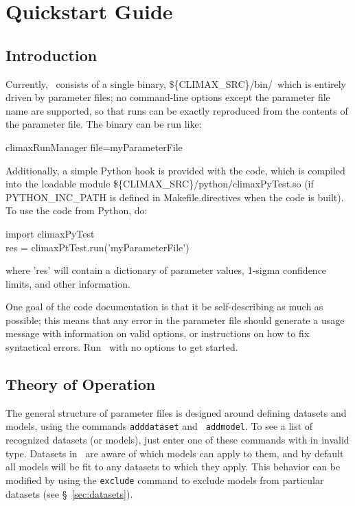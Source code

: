 \section{Quickstart Guide}

\subsection{Introduction}

Currently, \climax\ consists of a single binary, \$\{CLIMAX\_SRC\}/bin/\climaxb\, which is
entirely driven by parameter files; no command-line options except the
parameter file name are supported, so that runs can be exactly
reproduced from the contents of the parameter file.  The binary can be run like:

\begin{myindentpar}{3cm}
climaxRunManager file=myParameterFile
\end{myindentpar}

Additionally, a simple Python hook is provided with the code, which
is compiled into the loadable module
\$\{CLIMAX\_SRC\}/python/climaxPyTest.so (if PYTHON\_INC\_PATH is
defined in Makefile.directives when the code is built).  To use the
code from Python, do:

\begin{myindentpar}{3cm}
import climaxPyTest\\
res = climaxPtTest.run('myParameterFile')
\end{myindentpar}

where 'res' will contain a dictionary of parameter values, 1-sigma
confidence limits, and other information.

One goal of the code documentation is that it be self-describing as
much as possible; this means that any error in the parameter file
should generate a usage message with information on valid options, or
instructions on how to fix syntactical errors.  Run \climaxb\ with
no options to get started.

\subsection{Theory of Operation}

The general structure of parameter files is designed around defining
datasets and models, using the commands {\tt adddataset} and {\tt
  addmodel}.  To see a list of recognized datasets (or models), just
enter one of these commands with in invalid type.  Datasets in
\climax\ are aware of which models can apply to them, and by default
all models will be fit to any datasets to which they apply.  This
behavior can be modified by using the {\tt exclude} command to exclude
models from particular datasets (see \S~\ref{sec:datasets}).

